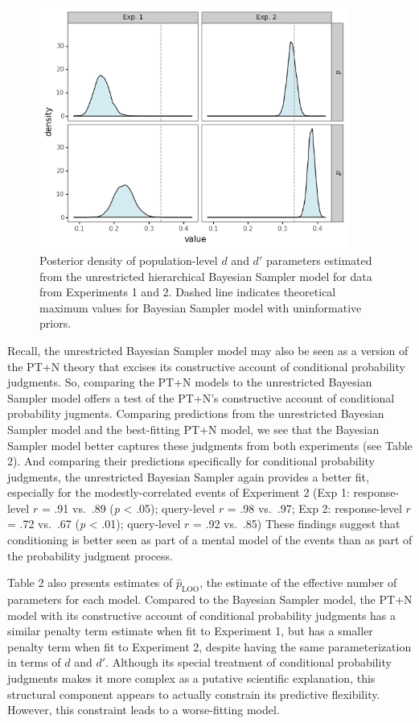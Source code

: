 \documentclass[
  english,
  man,floatsintext]{apa6}
\begin{document}
\begin{figure}[ht]
\centering
\includegraphics[width=4in]{plot_params.png}
\caption{Posterior density of population-level $d$  and $d'$ parameters estimated from the unrestricted hierarchical Bayesian Sampler model for data from Experiments 1 and 2. Dashed line indicates theoretical maximum values for Bayesian Sampler model with uninformative priors.}
\end{figure}

Recall, the unrestricted Bayesian Sampler model may also be seen as a version of the PT+N theory that excises its constructive account of conditional probability judgments. So, comparing the PT+N models to the unrestricted Bayesian Sampler model offers a test of the PT+N's constructive account of conditional probability jugments. Comparing predictions from the unrestricted Bayesian Sampler model and the best-fitting PT+N model, we see that the Bayesian Sampler model better captures these judgments from both experiments (see Table 2). And comparing their predictions specifically for conditional probability judgments, the unrestricted Bayesian Sampler again provides a better fit, especially for the modestly-correlated events of Experiment 2 (Exp 1: response-level \(r\) = .91 vs.~.89 (\emph{p} \textless{} .05); query-level \(r\) = .98 vs.~.97; Exp 2: response-level \(r\) = .72 vs.~.67 (\emph{p} \textless{} .01); query-level \(r\) = .92 vs.~.85) These findings suggest that conditioning is better seen as part of a mental model of the events than as part of the probability judgment process.

Table 2 also presents estimates of \(\hat{p}_{\text{LOO}}\), the estimate of the effective number of parameters for each model. Compared to the Bayesian Sampler model, the PT+N model with its constructive account of conditional probability judgments has a similar penalty term estimate when fit to Experiment 1, but has a smaller penalty term when fit to Experiment 2, despite having the same parameterization in terms of \(d\) and \(d'\). Although its special treatment of conditional probability judgments makes it more complex as a putative scientific explanation, this structural component appears to actually constrain its predictive flexibility. However, this constraint leads to a worse-fitting model.
\end{document}
